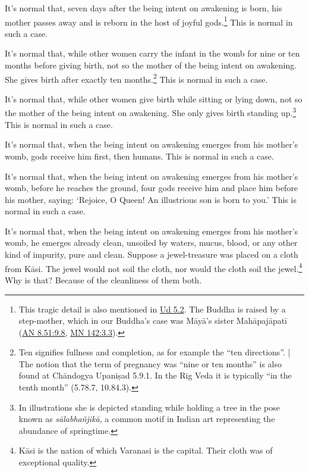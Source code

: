 \documentclass[12pt,openany]{book}%
\begin{document}
It’s normal that, seven days after the being intent on awakening is born, his mother passes away and is reborn in the host of joyful gods.\footnote{This tragic detail is also mentioned in \href{https://suttacentral.net/ud5.2/en/sujato}{Ud 5.2}. The Buddha is raised by a step-mother, which in our Buddha’s case was \textsanskrit{Māyā}’s sister \textsanskrit{Mahāpajāpatī} (\href{https://suttacentral.net/an8.51/en/sujato\#9.8}{AN 8.51:9.8}, \href{https://suttacentral.net/mn142/en/sujato\#3.3}{MN 142:3.3}). } This is normal in such a case. 

It’s normal that, while other women carry the infant in the womb for nine or ten months before giving birth, not so the mother of the being intent on awakening. She gives birth after exactly ten months.\footnote{Ten signifies fullness and completion, as for example the “ten directions”. | The notion that the term of pregnancy was “nine or ten months” is also found at \textsanskrit{Chāndogya} \textsanskrit{Upaniṣad} 5.9.1. In the Rig Veda it is typically “in the tenth month” (5.78.7, 10.84.3). } This is normal in such a case. 

It’s normal that, while other women give birth while sitting or lying down, not so the mother of the being intent on awakening. She only gives birth standing up.\footnote{In illustrations she is depicted standing while holding a tree in the pose known as \textit{\textsanskrit{sālabhañjikā}}, a common motif in Indian art representing the abundance of springtime. } This is normal in such a case. 

It’s normal that, when the being intent on awakening emerges from his mother’s womb, gods receive him first, then humans. This is normal in such a case. 

It’s normal that, when the being intent on awakening emerges from his mother’s womb, before he reaches the ground, four gods receive him and place him before his mother, saying: ‘Rejoice, O Queen! An illustrious son is born to you.’ This is normal in such a case. 

It’s normal that, when the being intent on awakening emerges from his mother’s womb, he emerges already clean, unsoiled by waters, mucus, blood, or any other kind of impurity, pure and clean. Suppose a jewel-treasure was placed on a cloth from \textsanskrit{Kāsi}. The jewel would not soil the cloth, nor would the cloth soil the jewel.\footnote{\textsanskrit{Kāsi} is the nation of which Varanasi is the capital. Their cloth was of exceptional quality. } Why is that? Because of the cleanliness of them both. 
\end{document}
